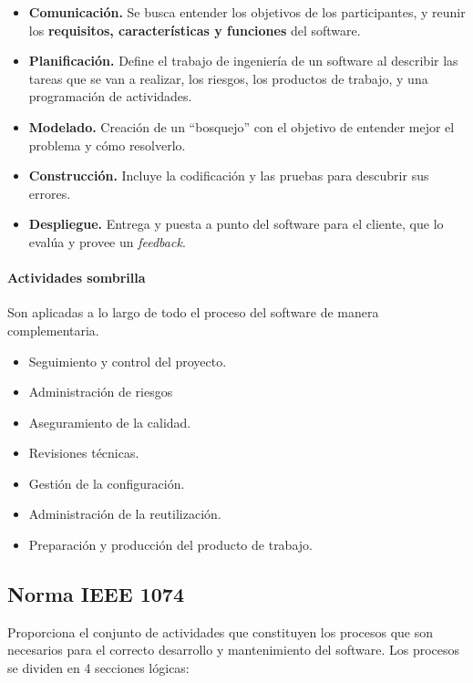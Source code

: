 \begin{itemize}
    \item \textbf{Comunicación.} Se busca entender los objetivos de los participantes, y reunir los \textbf{requisitos, características y funciones} del software.

    \item \textbf{Planificación.} Define el trabajo de ingeniería de un software al describir las tareas que se van a realizar, los riesgos, los productos de trabajo, y una programación de actividades.


    \item \textbf{Modelado.} Creación de un ``bosquejo'' con el objetivo de entender mejor el problema y cómo resolverlo.

    \item \textbf{Construcción.} Incluye la codificación y las pruebas para descubrir sus errores.

    \item \textbf{Despliegue.} Entrega y puesta a punto del software para el cliente, que lo evalúa y provee un \textit{feedback}.
\end{itemize}


\paragraph{Actividades sombrilla} Son aplicadas a lo largo de todo el proceso del software de manera complementaria.
\begin{itemize}
    \item Seguimiento y control del proyecto.
    \item Administración de riesgos
    \item Aseguramiento de la calidad.
    \item Revisiones técnicas.
    \item Gestión de la configuración. %
    \item Administración de la reutilización.
    \item Preparación y producción del producto de trabajo.

\end{itemize}



\subsection{Norma IEEE 1074}
Proporciona el conjunto de actividades que constituyen los procesos que son necesarios para el correcto desarrollo y mantenimiento del software. Los procesos se dividen en 4 secciones lógicas:

